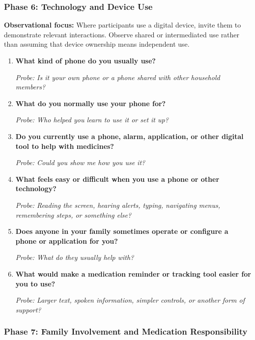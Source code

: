 \subsubsection{Phase 6: Technology and Device Use}

\textbf{Observational focus:} Where participants use a digital device, invite them to demonstrate relevant interactions. Observe shared or intermediated use rather than assuming that device ownership means independent use.

\begin{enumerate}[resume]
  \item \textbf{What kind of phone do you usually use?}

  \textit{Probe: Is it your own phone or a phone shared with other household members?}
  \item \textbf{What do you normally use your phone for?}

  \textit{Probe: Who helped you learn to use it or set it up?}
  \item \textbf{Do you currently use a phone, alarm, application, or other digital tool to help with medicines?}

  \textit{Probe: Could you show me how you use it?}
  \item \textbf{What feels easy or difficult when you use a phone or other technology?}

  \textit{Probe: Reading the screen, hearing alerts, typing, navigating menus, remembering steps, or something else?}
  \item \textbf{Does anyone in your family sometimes operate or configure a phone or application for you?}

  \textit{Probe: What do they usually help with?}
  \item \textbf{What would make a medication reminder or tracking tool easier for you to use?}

  \textit{Probe: Larger text, spoken information, simpler controls, or another form of support?}
\end{enumerate}

\subsubsection{Phase 7: Family Involvement and Medication Responsibility}

